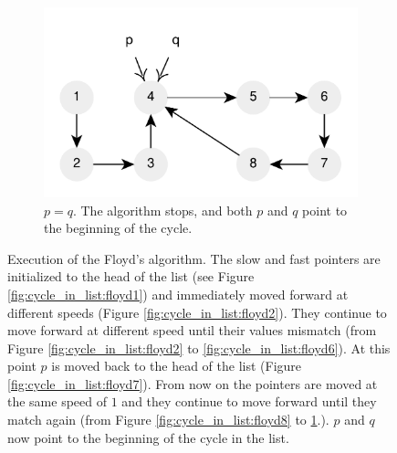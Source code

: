 \begin{figure}
\begin{subfigure}[l]{0.36\textwidth}
		\includegraphics[width=1\linewidth]{sources/cycle_in_list/images/floyd10}
		\caption{$p = q$. The algorithm stops, and both $p$ and $q$ point to the beginning of the cycle.}
		\label{fig:cycle_in_list:floyd10}
	 \end{subfigure}
	 \caption[Execution of the Floyd’s algorithm]{Execution of the Floyd’s algorithm. The slow and
	  fast pointers are initialized to the head of the list (see Figure
	  \ref{fig:cycle_in_list:floyd1}) and immediately moved forward at different speeds (Figure
	  \ref{fig:cycle_in_list:floyd2}). They continue to move forward at different speed until their
	  values mismatch (from Figure \ref{fig:cycle_in_list:floyd2} to
	  \ref{fig:cycle_in_list:floyd6}). At this point $p$ is moved back to the head of the list
	  (Figure \ref{fig:cycle_in_list:floyd7}). From now on the pointers are moved at the same speed
	  of $1$ and they continue to move forward until they match again (from Figure
	  \ref{fig:cycle_in_list:floyd8} to \ref{fig:cycle_in_list:floyd10}.). $p$ and $q$ now point to
	  the beginning of the cycle in the list.}
	  \label{fig:cycle_in_list:floyd}
\end{figure}